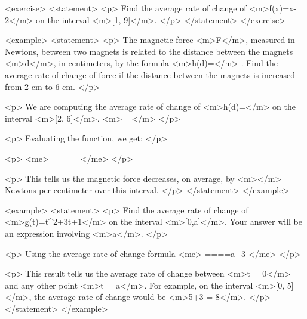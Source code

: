         <exercise>
            <statement>
                <p>
                    Find the average rate of change of <m>f(x)=x-2</m> on the interval <m>[1, 9]</m>.
                </p>
            </statement>
        </exercise>

        <example>
            <statement>
                <p>
                    The magnetic force <m>F</m>, measured in Newtons, between two magnets is related to the distance between the magnets <m>d</m>, in centimeters, by the formula <m>h(d)=</m> .
                    Find the average rate of change of force if the distance between the magnets is increased from 2 cm to 6 cm.
                </p>

                <p>
                    We are computing the average rate of change of <m>h(d)=</m> on the interval <m>[2, 6]</m>.
                    <m>= </m>
                </p>

                <p>
                    Evaluating the function, we get:
                </p>

                <p>
                    <me>
                        ====
                    </me>
                </p>

                <p>
                    This tells us the magnetic force decreases, on average, by <m></m> Newtons per centimeter over this interval.
                </p>
            </statement>
        </example>

        <example>
            <statement>
                <p>
                    Find the average rate of change of <m>g(t)=t^{2}+3t+1</m> on the interval <m>[0,a]</m>.
                    Your answer will be an expression involving <m>a</m>.
                </p>

                <p>
                    Using the average rate of change formula
                    <me>
                        ====a+3
                    </me>
                </p>

                <p>
                    This result tells us the average rate of change between <m>t = 0</m> and any other point <m>t = a</m>.
                    For example, on the interval <m>[0, 5]</m>, the average rate of change would be <m>5+3 = 8</m>.
                </p>
            </statement>
        </example>

